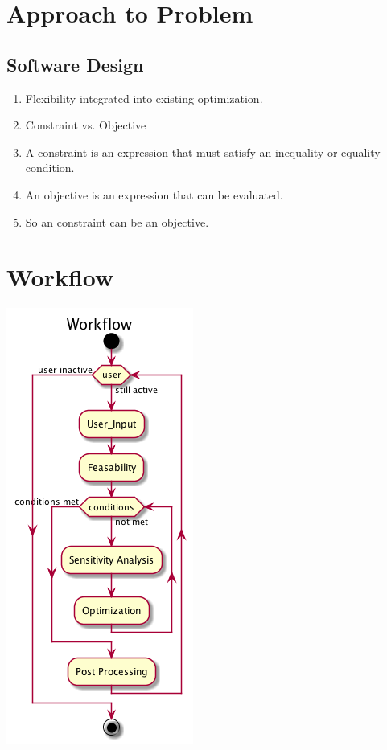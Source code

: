 \documentclass[11pt]{article}
\begin{document}
	
\section{Approach to Problem}

\subsection{Software Design}
	\begin{enumerate}
	
		
		
		\item Flexibility integrated into existing optimization.
				
		\item Constraint vs. Objective
	
		\item A constraint is an expression that must satisfy an inequality or equality condition.
		
		\item An objective is an expression that can be evaluated.
		
		\item So an constraint can be an objective. 
		
	\end{enumerate}
	
\section{Workflow}
	 \begin{center}\includegraphics[scale=.5]{IMSM_Workflow.png}\end{center}
\end{document}
